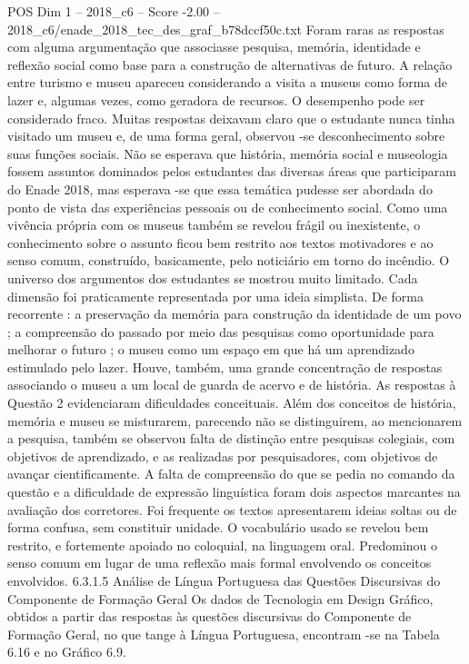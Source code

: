 \begin{textsample}{POS Dim 1 – 2018\_c6 – Score -2.00 – 2018\_c6/enade\_2018\_tec\_des\_graf\_b78dccf50c.txt}
Foram raras as respostas com alguma argumentação que associasse pesquisa, memória, identidade e reflexão social como base para a construção de alternativas de futuro.
A relação entre turismo e museu apareceu considerando a visita a museus como forma de lazer e, algumas vezes, como geradora de recursos.
O desempenho pode ser considerado fraco.
Muitas respostas deixavam claro que o estudante nunca tinha visitado um museu e, de uma forma geral, observou -se desconhecimento sobre suas funções sociais.
Não se esperava que história, memória social e museologia fossem assuntos dominados pelos estudantes das diversas áreas que participaram do Enade 2018, mas esperava -se que essa temática pudesse ser abordada do ponto de vista das experiências pessoais ou de conhecimento social.
Como uma vivência própria com os museus também se revelou frágil ou inexistente, o conhecimento sobre o assunto ficou bem restrito aos textos motivadores e ao senso comum, construído, basicamente, pelo noticiário em torno do incêndio.
O universo dos argumentos dos estudantes se mostrou muito limitado.
Cada dimensão foi praticamente representada por uma ideia simplista.
De forma recorrente : a preservação da memória para construção da identidade de um povo ; a compreensão do passado por meio das pesquisas como oportunidade para melhorar o futuro ; o museu como um espaço em que há um aprendizado estimulado pelo lazer.
Houve, também, uma grande concentração de respostas associando o museu a um local de guarda de acervo e de história.
As respostas à Questão 2 evidenciaram dificuldades conceituais.
Além dos conceitos de história, memória e museu se misturarem, parecendo não se distinguirem, ao mencionarem a pesquisa, também se observou falta de distinção entre pesquisas colegiais, com objetivos de aprendizado, e as realizadas por pesquisadores, com objetivos de avançar cientificamente.
A falta de compreensão do que se pedia no comando da questão e a dificuldade de expressão linguística foram dois aspectos marcantes na avaliação dos corretores.
Foi frequente os textos apresentarem ideias soltas ou de forma confusa, sem constituir unidade.
O vocabulário usado se revelou bem restrito, e fortemente apoiado no coloquial, na linguagem oral.
Predominou o senso comum em lugar de uma reflexão mais formal envolvendo os conceitos envolvidos. 6.3.1.5 Análise de Língua Portuguesa das Questões Discursivas do Componente de Formação Geral Os dados de Tecnologia em Design Gráfico, obtidos a partir das respostas às questões discursivas do Componente de Formação Geral, no que tange à Língua Portuguesa, encontram -se na Tabela 6.16 e no Gráfico 6.9.

\end{textsample}
